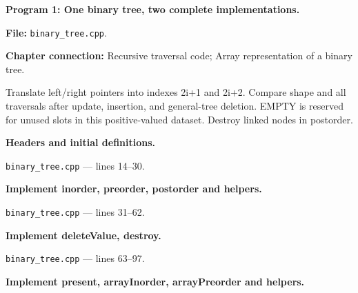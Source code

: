 \textbf{Program 1: One binary tree, two complete implementations.}

\textbf{File:} \texttt{binary\_tree.cpp}.

\textbf{Chapter connection:} Recursive traversal code; Array representation of a binary tree.

Translate left/right pointers into indexes 2i+1 and 2i+2. Compare shape and all traversals after update, insertion, and general-tree deletion. EMPTY is reserved for unused slots in this positive-valued dataset. Destroy linked nodes in postorder.



\begin{utpsteps}\setcounter{enumi}{0}\item \textbf{Headers and initial definitions.}\end{utpsteps}

\texttt{binary\_tree.cpp} --- lines 14--30.




\tcbbreak

\begin{utpsteps}\setcounter{enumi}{1}\item \textbf{Implement inorder, preorder, postorder and helpers.}\end{utpsteps}

\texttt{binary\_tree.cpp} --- lines 31--62.






\tcbbreak

\begin{utpsteps}\setcounter{enumi}{2}\item \textbf{Implement deleteValue, destroy.}\end{utpsteps}

\texttt{binary\_tree.cpp} --- lines 63--97.






\tcbbreak

\begin{utpsteps}\setcounter{enumi}{3}\item \textbf{Implement present, arrayInorder, arrayPreorder and helpers.}\end{utpsteps}

